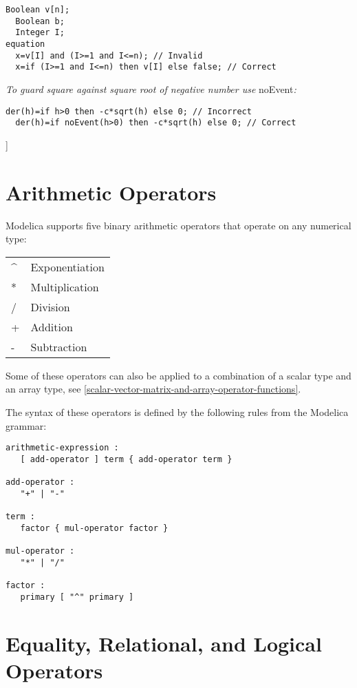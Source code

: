\begin{lstlisting}[language=modelica]
  Boolean v[n];
  Boolean b;
  Integer I;
equation
  x=v[I] and (I>=1 and I<=n); // Invalid
  x=if (I>=1 and I<=n) then v[I] else false; // Correct
\end{lstlisting}

\emph{To guard square against square root of negative number use}
noEvent\emph{:}
\begin{lstlisting}[language=modelica]
  der(h)=if h>0 then -c*sqrt(h) else 0; // Incorrect
  der(h)=if noEvent(h>0) then -c*sqrt(h) else 0; // Correct
\end{lstlisting}
{]}

\section{Arithmetic Operators}

Modelica supports five binary arithmetic operators that operate on any
numerical type:

\begin{longtable}[c]{ll}
\^{} & Exponentiation\\
* & Multiplication\\ 
/ & Division\\ 
+ & Addition\\ 
- & Subtraction\\
\end{longtable}

Some of these operators can also be applied to a combination of a scalar
type and an array type, see \autoref{scalar-vector-matrix-and-array-operator-functions}.

The syntax of these operators is defined by the following rules from the
Modelica grammar:

\begin{lstlisting}[language=grammar]
arithmetic-expression :
   [ add-operator ] term { add-operator term }

add-operator :
   "+" | "-"
   
term :
   factor { mul-operator factor }

mul-operator :
   "*" | "/"
   
factor :
   primary [ "^" primary ]
\end{lstlisting}

\section{Equality, Relational, and Logical Operators}

